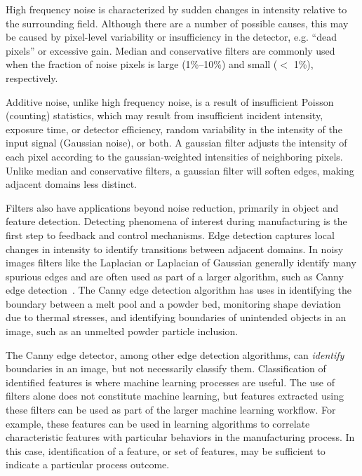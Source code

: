 High frequency noise is characterized by sudden changes in intensity relative to the surrounding field. Although there are a number of possible causes, this may be caused by pixel-level variability or insufficiency in the detector, e.g. ``dead pixels'' or excessive gain. Median and conservative filters are commonly used when the fraction of noise pixels is large (1\%--10\%) and small ($<$ 1\%), respectively.

Additive noise, unlike high frequency noise, is a result of insufficient Poisson (counting) statistics, which may result from insufficient incident intensity, exposure time, or detector efficiency, random variability in the intensity of the input signal (Gaussian noise), or both. A gaussian filter adjusts the intensity of each pixel according to the gaussian-weighted intensities of neighboring pixels. Unlike median and conservative filters, a gaussian filter will soften edges, making adjacent domains less distinct.

Filters also have applications beyond noise reduction, primarily in object and feature detection. Detecting phenomena of interest during manufacturing is the first step to feedback and control mechanisms. Edge detection captures local changes in intensity to identify transitions between adjacent domains. In noisy images filters like the Laplacian or Laplacian of Gaussian generally identify many spurious edges and are often used as part of a larger algorithm, such as Canny edge detection~\cite{Canny1986}. The Canny edge detection algorithm has uses in identifying the boundary between a melt pool and a powder bed, monitoring shape deviation due to thermal stresses, and identifying boundaries of unintended objects in an image, such as an unmelted powder particle inclusion. 

The Canny edge detector, among other edge detection algorithms, can \textit{identify} boundaries in an image, but not necessarily classify them. Classification of identified features is where machine learning processes are useful. The use of filters alone does not constitute machine learning, but features extracted using these filters can be used as part of the larger machine learning workflow. For example, these features can be used in learning algorithms to correlate characteristic features with particular behaviors in the manufacturing process. In this case, identification of a feature, or set of features, may be sufficient to indicate a particular process outcome.

